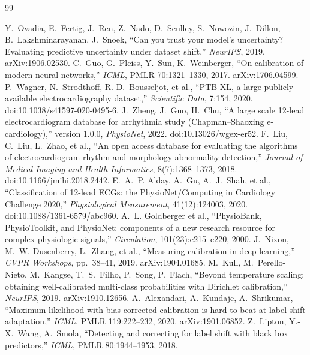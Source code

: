 \documentclass[review,12pt,nonatbib]{elsarticle}
\begin{document}
\begin{thebibliography}{99}
\raggedright
 Y.~Ovadia, E.~Fertig, J.~Ren, Z.~Nado,
D.~Sculley, S.~Nowozin, J.~Dillon, B.~Lakshminarayanan, J.~Snoek,
``Can you trust your model's uncertainty? Evaluating predictive
uncertainty under dataset shift,'' \emph{NeurIPS}, 2019.
arXiv:1906.02530.
 C.~Guo, G.~Pleiss, Y.~Sun, K.~Weinberger,
``On calibration of modern neural networks,'' \emph{ICML}, PMLR
70:1321--1330, 2017. arXiv:1706.04599.
 P.~Wagner, N.~Strodthoff, R.-D.~Bousseljot,
et al., ``PTB-XL, a large publicly available electrocardiography
dataset,'' \emph{Scientific Data}, 7:154, 2020.
doi:10.1038/s41597-020-0495-6.
 J.~Zheng, J.~Guo, H.~Chu,
``A large scale 12-lead electrocardiogram database for arrhythmia
study (Chapman--Shaoxing e-cardiology),'' version 1.0.0,
\emph{PhysioNet}, 2022. doi:10.13026/wgex-er52.
 F.~Liu, C.~Liu, L.~Zhao, et al., ``An open
access database for evaluating the algorithms of electrocardiogram
rhythm and morphology abnormality detection,'' \emph{Journal of
Medical Imaging and Health Informatics}, 8(7):1368--1373, 2018.
doi:10.1166/jmihi.2018.2442.
 E.~A.~P. Alday, A.~Gu, A.~J.~Shah, et al.,
``Classification of 12-lead ECGs: the PhysioNet/Computing in
Cardiology Challenge 2020,'' \emph{Physiological Measurement},
41(12):124003, 2020. doi:10.1088/1361-6579/abc960.
 A.~L. Goldberger et al., ``PhysioBank,
PhysioToolkit, and PhysioNet: components of a new research resource
for complex physiologic signals,'' \emph{Circulation},
101(23):e215--e220, 2000.
 J.~Nixon, M.~W. Dusenberry, L.~Zhang, et al.,
``Measuring calibration in deep learning,'' \emph{CVPR Workshops},
pp.~38--41, 2019. arXiv:1904.01685.
 M.~Kull, M.~Perello-Nieto, M.~Kangse,
T.~S.~Filho, P.~Song, P.~Flach, ``Beyond temperature scaling:
obtaining well-calibrated multi-class probabilities with Dirichlet
calibration,'' \emph{NeurIPS}, 2019. arXiv:1910.12656.
 A.~Alexandari, A.~Kundaje, A.~Shrikumar,
``Maximum likelihood with bias-corrected calibration is hard-to-beat
at label shift adaptation,'' \emph{ICML}, PMLR 119:222--232, 2020.
arXiv:1901.06852.
 Z.~Lipton, Y.-X.~Wang, A.~Smola,
``Detecting and correcting for label shift with black box
predictors,'' \emph{ICML}, PMLR 80:1944--1953, 2018.

\end{thebibliography}
\end{document}
